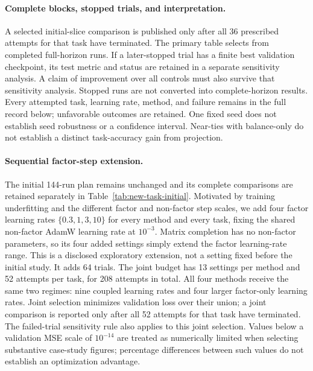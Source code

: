 \paragraph{Complete blocks, stopped trials, and interpretation.}
A selected initial-slice comparison is published only after all 36
prescribed attempts for that task have terminated. The primary table selects from
completed full-horizon runs. If a later-stopped trial has a finite best
validation checkpoint, its test metric and status are retained in a
separate sensitivity analysis. A claim of improvement over all controls
must also survive that sensitivity analysis. Stopped runs are not
converted into complete-horizon results. Every attempted task,
learning rate, method, and failure remains in the full record below;
unfavorable outcomes are retained. One fixed seed does not establish
seed robustness or a confidence interval. Near-ties with balance-only
do not establish a distinct task-accuracy gain from projection.

\paragraph{Sequential factor-step extension.}
The initial 144-run plan remains unchanged and its complete comparisons
are retained separately in Table~\ref{tab:new-task-initial}.
Motivated by training underfitting and the different factor and
non-factor step scales, we add four factor learning rates
$\{0.3,1,3,10\}$ for every method and every task, fixing the shared
non-factor AdamW learning rate at $10^{-3}$.
Matrix completion has no non-factor parameters, so its four added
settings simply extend the factor learning-rate range.
This is a disclosed exploratory extension, not a setting fixed before
the initial study. It adds 64 trials. The joint budget has 13 settings
per method and 52 attempts per task, for 208 attempts in total.
All four methods receive the same two regimes: nine coupled learning
rates and four larger factor-only learning rates.
Joint selection minimizes validation loss over their union; a joint
comparison is reported only after all 52 attempts for that task have
terminated. The failed-trial sensitivity rule also applies to this
joint selection. Values below a validation MSE scale of $10^{-14}$
are treated as numerically limited when selecting substantive
case-study figures; percentage differences between such values do
not establish an optimization advantage.





\FloatBarrier
